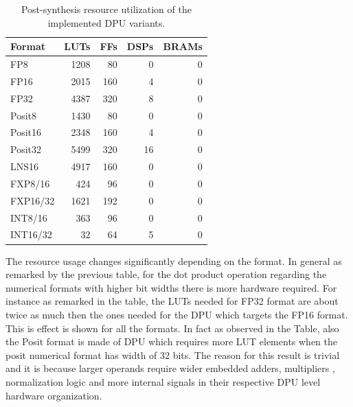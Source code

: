 \begin{table}[htbp]
    \centering
    \caption{Post-synthesis resource utilization of the implemented DPU variants.}
    \label{tab:dpu_resource_utilization}
    \begin{tabular}{lrrrr}
        \hline
        \textbf{Format} & \textbf{LUTs} & \textbf{FFs} & \textbf{DSPs} & \textbf{BRAMs} \\
        \hline
        FP8        & 1208 & 80  & 0  & 0 \\
        FP16       & 2015 & 160 & 4  & 0 \\
        FP32       & 4387 & 320 & 8  & 0 \\
        Posit8     & 1430 & 80  & 0  & 0 \\
        Posit16    & 2348 & 160 & 4  & 0 \\
        Posit32    & 5499 & 320 & 16 & 0 \\
        LNS16      & 4917 & 160 & 0  & 0 \\
        FXP8/16    & 424  & 96  & 0  & 0 \\
        FXP16/32   & 1621 & 192 & 0  & 0 \\
        INT8/16    & 363  & 96  & 0  & 0 \\
        INT16/32   & 32   & 64  & 5  & 0 \\
        \hline
    \end{tabular}
\end{table}


The resource usage changes significantly depending on the format. In general as remarked by the previous table, for the dot product operation regarding the numerical formats with higher bit widths there is more hardware required. For instance as remarked in the table, the LUTs needed for FP32 format are about twice as much then the ones needed for the DPU which targets the FP16 format. This is effect is shown for all the formats. In fact as observed in the Table, also the Posit format is made of DPU which requires more LUT elements when the posit numerical format has width of 32 bits. The reason for this result is trivial and it is because larger operands require wider embedded adders, multipliers , normalization logic and more internal signals in their respective DPU level hardware organization. 

